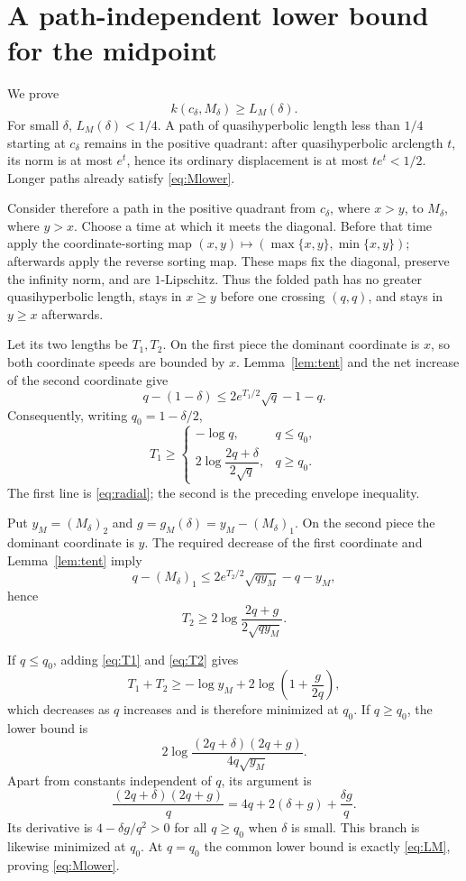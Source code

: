 \documentclass[11pt]{article}
\begin{document}
\section{A path-independent lower bound for the midpoint}

We prove
\begin{equation}\label{eq:Mlower}
 k(c_\delta,M_\delta)\geq L_M(\delta).
\end{equation}
For small $\delta$, $L_M(\delta)<1/4$.  A path of quasihyperbolic length
less than $1/4$ starting at $c_\delta$ remains in the positive quadrant:
after quasihyperbolic arclength $t$, its norm is at most $e^t$, hence its
ordinary displacement is at most $te^t<1/2$.  Longer paths already satisfy
\eqref{eq:Mlower}.

Consider therefore a path in the positive quadrant from $c_\delta$, where
$x>y$, to $M_\delta$, where $y>x$. Choose a time at which it meets the
diagonal. Before that time apply the coordinate-sorting map
$(x,y)\mapsto(\max\{x,y\},\min\{x,y\})$; afterwards apply the reverse sorting
map. These maps fix the diagonal, preserve the infinity norm, and are
$1$-Lipschitz. Thus the folded path has no greater quasihyperbolic length,
stays in $x\geq y$ before one crossing $(q,q)$, and stays in $y\geq x$
afterwards.

Let its two lengths be $T_1,T_2$.  On the first piece the dominant coordinate
is $x$, so both coordinate speeds are bounded by $x$. Lemma~\ref{lem:tent}
and the net increase of the second coordinate give
\[
 q-(1-\delta)
 \leq 2e^{T_1/2}\sqrt q-1-q.
\]
Consequently, writing $q_0=1-\delta/2$,
\begin{equation}\label{eq:T1}
 T_1\geq
 \begin{cases}
  -\log q,&q\leq q_0,\\[2mm]
  2\log\dfrac{2q+\delta}{2\sqrt q},&q\geq q_0.
 \end{cases}
\end{equation}
The first line is \eqref{eq:radial}; the second is the preceding envelope
inequality.

Put $y_M=(M_\delta)_2$ and $g=g_M(\delta)=y_M-(M_\delta)_1$. On the second
piece the dominant coordinate is $y$.  The required decrease of the first
coordinate and Lemma~\ref{lem:tent} imply
\[
 q-(M_\delta)_1
 \leq 2e^{T_2/2}\sqrt{qy_M}-q-y_M,
\]
hence
\begin{equation}\label{eq:T2}
 T_2\geq2\log\frac{2q+g}{2\sqrt{qy_M}}.
\end{equation}

If $q\leq q_0$, adding \eqref{eq:T1} and \eqref{eq:T2} gives
\[
 T_1+T_2
 \geq -\log y_M+2\log\left(1+\frac{g}{2q}\right),
\]
which decreases as $q$ increases and is therefore minimized at $q_0$.
If $q\geq q_0$, the lower bound is
\[
 2\log\frac{(2q+\delta)(2q+g)}{4q\sqrt{y_M}}.
\]
Apart from constants independent of $q$, its argument is
\[
 \frac{(2q+\delta)(2q+g)}q
 =4q+2(\delta+g)+\frac{\delta g}{q}.
\]
Its derivative is $4-\delta g/q^2>0$ for all $q\geq q_0$ when $\delta$ is
small. This branch is likewise minimized at $q_0$. At $q=q_0$ the common
lower bound is exactly \eqref{eq:LM}, proving \eqref{eq:Mlower}.
\end{document}
